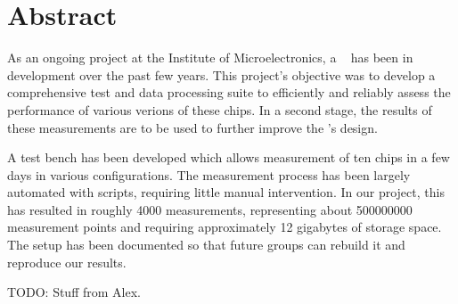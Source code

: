 \chapter*{Abstract}
\label{ch:abstract}

As an ongoing  project at the Institute of Microelectronics,  a \sdm~ has been
in development over the past few years. This project's objective was to develop
a comprehensive  test and  data processing suite  to efficiently  and reliably
assess the performance  of various verions of these chips. In  a second stage,
the results of these measurements are to be used to further improve the \sdm's
design.

A  test  bench  has been  developed  which  allows  measurement of ten  chips  in
a  few  days  in  various configurations. The  measurement  process  has  been
largely automated  with scripts, requiring little  manual intervention. In our
project, this  has resulted  in roughly \num{4000}  measurements, representing
about \num{500000000} measurement points  and requiring approximately \num{12}
gigabytes  of storage  space. The setup  has  been documented  so that  future
groups can rebuild it and reproduce our results.

TODO: Stuff from Alex.
